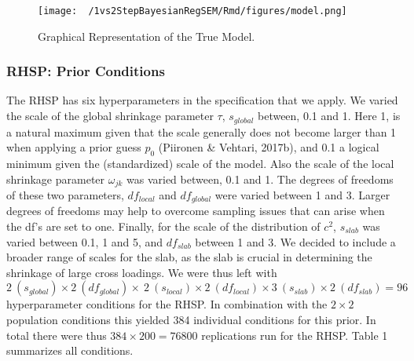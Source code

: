 \documentclass[
  man, donotrepeattitle,floatsintext]{apa6}
\begin{document}
\begin{figure}
\centering
\texttt{[image: ~/1vs2StepBayesianRegSEM/Rmd/figures/model.png]}
\caption{Graphical Representation of the True
Model.}
\end{figure}

\hypertarget{rhsp-prior-conditions}{%
\subsubsection{RHSP: Prior Conditions}\label{rhsp-prior-conditions}}

The RHSP has six hyperparameters in the specification that we apply. We
varied the scale of the global shrinkage parameter \(\tau\), \(s_{global}\)
between, 0.1 and 1. Here 1, is a natural maximum given that the scale
generally does not become larger than 1 when applying a prior guess
\(p_0\) (Piironen \& Vehtari, 2017b), and 0.1 a logical minimum given the
(standardized) scale of the model. Also the scale of the local shrinkage
parameter \(\omega_{jk}\) was varied between, 0.1 and 1. The degrees of
freedoms of these two parameters, \(df_{local}\) and \(df_{global}\) were
varied between 1 and 3. Larger degrees of freedoms may help to overcome
sampling issues that can arise when the df's are set to one. Finally,
for the scale of the distribution of \(c^2\), \(s_{slab}\) was varied
between 0.1, 1 and 5, and \(df_{slab}\) between 1 and 3. We decided to
include a broader range of scales for the slab, as the slab is crucial
in determining the shrinkage of large cross loadings. We were thus left
with
\(2 \ (s_{global}) \times 2 \ (df_{global}) \times \ 2 \ (s_{local}) \times2 \ (df_{local}) \times 3 \ (s_{slab}) \times2 \ (df_{slab}) = 96\)
hyperparameter conditions for the RHSP. In combination with the
\(2 \times 2\) population conditions this yielded 384 individual
conditions for this prior. In total there were thus
\(384 \times 200 = 76800\) replications run for the RHSP. Table 1
summarizes all conditions.
\end{document}
